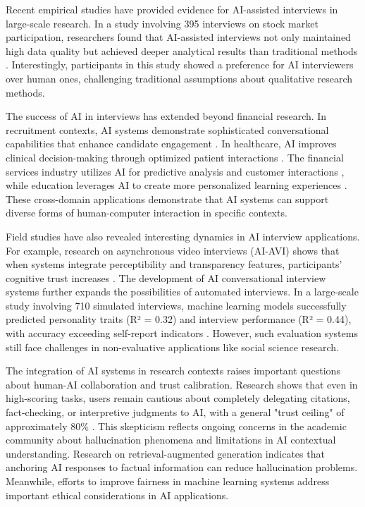 \documentclass[sigchi,nonacm,manuscript]{acmart}
\begin{document}
Recent empirical studies have provided evidence for AI-assisted interviews in large-scale research. In a study involving 395 interviews on stock market participation, researchers found that AI-assisted interviews not only maintained high data quality but achieved deeper analytical results than traditional methods \citep{chopraConductingQualitativeInterviews2023}. Interestingly, participants in this study showed a preference for AI interviewers over human ones, challenging traditional assumptions about qualitative research methods.

The success of AI in interviews has extended beyond financial research. In recruitment contexts, AI systems demonstrate sophisticated conversational capabilities that enhance candidate engagement \citep{ahmadFutureRecruitmentUsing2024}. In healthcare, AI improves clinical decision-making through optimized patient interactions \citep{alowaisRevolutionizingHealthcareRole2023, krishnanArtificialIntelligenceClinical2023}. The financial services industry utilizes AI for predictive analysis and customer interactions \citep{bahooArtificialIntelligenceFinance2024}, while education leverages AI to create more personalized learning experiences \citep{sapciArtificialIntelligenceEducation2020}. These cross-domain applications demonstrate that AI systems can support diverse forms of human-computer interaction in specific contexts.

Field studies have also revealed interesting dynamics in AI interview applications. For example, research on asynchronous video interviews (AI-AVI) shows that when systems integrate perceptibility and transparency features, participants' cognitive trust increases \citep{suenHung2023}. The development of AI conversational interview systems \citep{wuttkeAIConversationalInterviewing2024} further expands the possibilities of automated interviews. In a large-scale study involving 710 simulated interviews, machine learning models successfully predicted personality traits (R² = 0.32) and interview performance (R² = 0.44), with accuracy exceeding self-report indicators \citep{koutsoumpis2024}. However, such evaluation systems still face challenges in non-evaluative applications like social science research.

The integration of AI systems in research contexts raises important questions about human-AI collaboration and trust calibration. Research shows that even in high-scoring tasks, users remain cautious about completely delegating citations, fact-checking, or interpretive judgments to AI, with a general "trust ceiling" of approximately 80\% \citep{openaiGPT4TechnicalReport2024}. This skepticism reflects ongoing concerns in the academic community about hallucination phenomena and limitations in AI contextual understanding. Research on retrieval-augmented generation \citep{shusterRetrievalAugmentationReduces2021} indicates that anchoring AI responses to factual information can reduce hallucination problems. Meanwhile, efforts to improve fairness in machine learning systems \citep{holsteinImprovingFairnessMachine2019} address important ethical considerations in AI applications.
\end{document}
